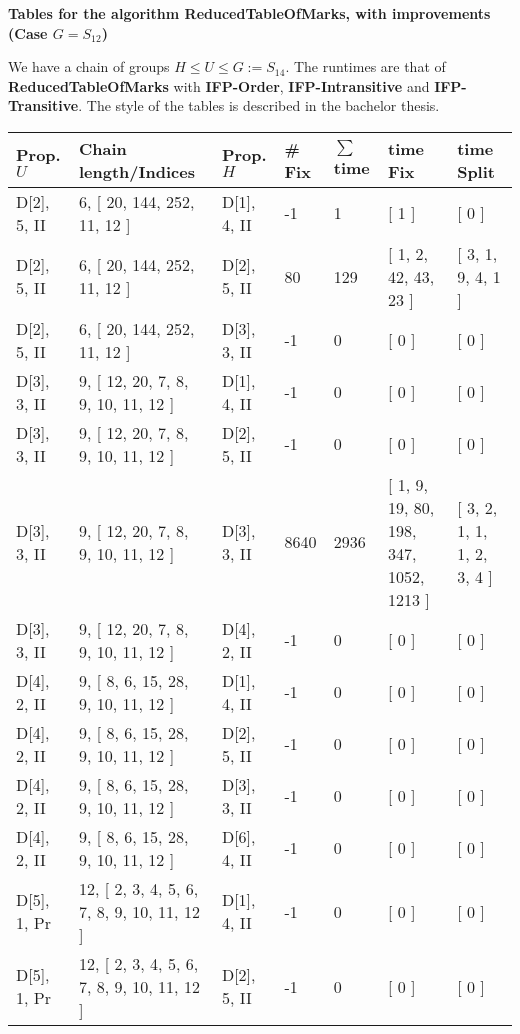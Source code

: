 \documentclass[9 pt]{scrartcl}
\begin{document}
\begin{center}

\textbf{\LARGE Tables for the algorithm ReducedTableOfMarks, with improvements (Case $G=S_{12}$)} 

\end{center}
We have a chain of groups $H \leq U \leq G:=S_{14}$. The runtimes are that of \textbf{ReducedTableOfMarks} with \textbf{IFP-Order}, \textbf{IFP-Intransitive} and \textbf{IFP-Transitive}. The style of the tables is described in the bachelor thesis.
\begin{longtable}{ |p{3em}|p{6em}|p{3em}|p{2em}|p{2em}|p{6em}|p{6em}| }\hline 
    Prop. $U$ & Chain length/Indices & Prop. $H$ & \# Fix & $\sum$ time & time Fix& time Split   \\ \hline
D[2], 5, II &6, [ 20, 144, 252, 11, 12 ] & D[1], 4, II  & -1 & 1 & [ 1 ] & [ 0 ]\\ \hline
D[2], 5, II &6, [ 20, 144, 252, 11, 12 ] & D[2], 5, II  & 80 & 129 & [ 1, 2, 42, 43, 23 ] & [ 3, 1, 9, 4, 1 ]\\ \hline
D[2], 5, II &6, [ 20, 144, 252, 11, 12 ] & D[3], 3, II  & -1 & 0 & [ 0 ] & [ 0 ]\\ \hline
D[3], 3, II &9, [ 12, 20, 7, 8, 9, 10, 11, 12 ] & D[1], 4, II  & -1 & 0 & [ 0 ] & [ 0 ]\\ \hline
D[3], 3, II &9, [ 12, 20, 7, 8, 9, 10, 11, 12 ] & D[2], 5, II  & -1 & 0 & [ 0 ] & [ 0 ]\\ \hline
D[3], 3, II &9, [ 12, 20, 7, 8, 9, 10, 11, 12 ] & D[3], 3, II  & 8640 & 2936 & [ 1, 9, 19, 80, 198, 347, 1052, 1213 ] & [ 3, 2, 1, 1, 1, 2, 3, 4 ]\\ \hline
D[3], 3, II &9, [ 12, 20, 7, 8, 9, 10, 11, 12 ] & D[4], 2, II  & -1 & 0 & [ 0 ] & [ 0 ]\\ \hline
D[4], 2, II &9, [ 8, 6, 15, 28, 9, 10, 11, 12 ] & D[1], 4, II  & -1 & 0 & [ 0 ] & [ 0 ]\\ \hline
D[4], 2, II &9, [ 8, 6, 15, 28, 9, 10, 11, 12 ] & D[2], 5, II  & -1 & 0 & [ 0 ] & [ 0 ]\\ \hline
D[4], 2, II &9, [ 8, 6, 15, 28, 9, 10, 11, 12 ] & D[3], 3, II  & -1 & 0 & [ 0 ] & [ 0 ]\\ \hline
D[4], 2, II &9, [ 8, 6, 15, 28, 9, 10, 11, 12 ] & D[6], 4, II  & -1 & 0 & [ 0 ] & [ 0 ]\\ \hline
D[5], 1, Pr &12, [ 2, 3, 4, 5, 6, 7, 8, 9, 10, 11, 12 ] & D[1], 4, II  & -1 & 0 & [ 0 ] & [ 0 ]\\ \hline
D[5], 1, Pr &12, [ 2, 3, 4, 5, 6, 7, 8, 9, 10, 11, 12 ] & D[2], 5, II  & -1 & 0 & [ 0 ] & [ 0 ]\\ \hline

\end{longtable}
\end{document}
